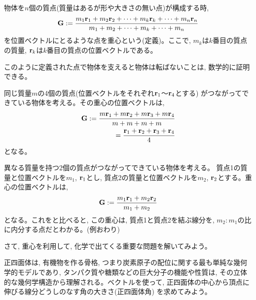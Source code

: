 物体を$n$個の質点(質量はあるが形や大きさの無い点)が構成する時, 
\begin{eqnarray}
{\bf G}:=\frac{m_1{\bf r}_1+m_2{\bf r}_2+\cdots+m_k{\bf r}_k+\cdots+m_n{\bf r}_n}{m_1+m_2+\cdots+m_k+\cdots+m_n}\nonumber\\
\end{eqnarray}
を位置ベクトルにとるような点を重心という(定義)。ここで, $m_k$は$k$番目の質点の質量, 
${\bf r}_k$は$k$番目の質点の位置ベクトルである。

このように定義された点で物体を支えると物体は転ばないことは, 数学的に証明できる。

\begin{exmpl} 同じ質量$m$の4個の質点(位置ベクトルをそれぞれ${\bf r}_1$〜${\bf r}_4$とする)
がつながってできている物体を考える。その重心の位置ベクトルは, 
\begin{eqnarray}
{\bf G}:=\frac{m{\bf r}_1+m{\bf r}_2+m{\bf r}_3+m{\bf r}_4}{m+m+m+m}\nonumber\\
=\frac{{\bf r}_1+{\bf r}_2+{\bf r}_3+{\bf r}_4}{4}\label{vect_gravcent4}
\end{eqnarray}
となる。\end{exmpl}

\begin{exmpl} 異なる質量を持つ2個の質点がつながってできている物体を考える。
質点1の質量と位置ベクトルを$m_1$, ${\bf r}_1$とし, 
質点2の質量と位置ベクトルを$m_2$, ${\bf r}_2$とする。重心の位置ベクトルは, 
\begin{eqnarray}
{\bf G}:=\frac{m_1{\bf r}_1+m_2{\bf r}_2}{m_1+m_2}
\end{eqnarray}
となる。これをと比べると, この重心は, 
質点1と質点2を結ぶ線分を, $m_2:m_1$の比に内分する点だとわかる。(例おわり)
\end{exmpl}
\hv

さて, 重心を利用して, 化学で出てくる重要な問題を解いてみよう。

正四面体は, 有機物を作る骨格, つまり炭素原子の配位に関する最も単純な幾何学的モデルであり, 
タンパク質や糖類などの巨大分子の機能や性質は, その立体的な幾何学構造から理解される。ベクトルを使って, 
正四面体の中心から頂点に伸びる線分どうしのなす角の大きさ(正四面体角)
を求めてみよう。

